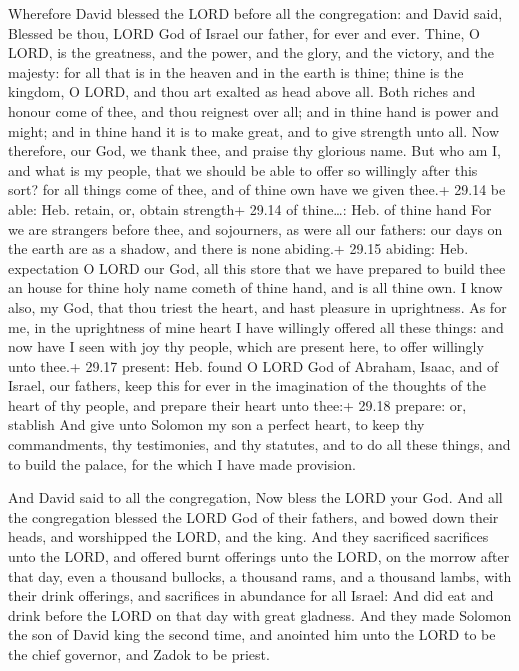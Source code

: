  Wherefore David blessed the LORD before all the
congregation: and David said, Blessed be thou, LORD God of Israel our
father, for ever and ever.  Thine, O LORD, is the
greatness, and the power, and the glory, and the victory, and the
majesty: for all that is in the heaven and in the earth is thine; thine
is the kingdom, O LORD, and thou art exalted as head above all.
 Both riches and honour come of thee, and thou reignest
over all; and in thine hand is power and might; and in thine hand it is
to make great, and to give strength unto all.  Now
therefore, our God, we thank thee, and praise thy glorious name.
 But who am I, and what is my people, that we should be
able to offer so willingly after this sort? for all things come of thee,
and of thine own have we given thee.+ 29.14 be able: Heb. retain, or,
obtain strength+ 29.14 of thine\ldots: Heb. of thine hand 
For we are strangers before thee, and sojourners, as were all our
fathers: our days on the earth are as a shadow, and there is none
abiding.+ 29.15 abiding: Heb. expectation  O LORD our God,
all this store that we have prepared to build thee an house for thine
holy name cometh of thine hand, and is all thine own.  I
know also, my God, that thou triest the heart, and hast pleasure in
uprightness. As for me, in the uprightness of mine heart I have
willingly offered all these things: and now have I seen with joy thy
people, which are present here, to offer willingly unto thee.+ 29.17
present: Heb. found  O LORD God of Abraham, Isaac, and of
Israel, our fathers, keep this for ever in the imagination of the
thoughts of the heart of thy people, and prepare their heart unto thee:+
29.18 prepare: or, stablish  And give unto Solomon my son a
perfect heart, to keep thy commandments, thy testimonies, and thy
statutes, and to do all these things, and to build the palace, for the
which I have made provision.

 And David said to all the congregation, Now bless the
LORD your God. And all the congregation blessed the LORD God of their
fathers, and bowed down their heads, and worshipped the LORD, and the
king.  And they sacrificed sacrifices unto the LORD, and
offered burnt offerings unto the LORD, on the morrow after that day,
even a thousand bullocks, a thousand rams, and a thousand lambs, with
their drink offerings, and sacrifices in abundance for all Israel:
 And did eat and drink before the LORD on that day with
great gladness. And they made Solomon the son of David king the second
time, and anointed him unto the LORD to be the chief governor, and Zadok
to be priest.

